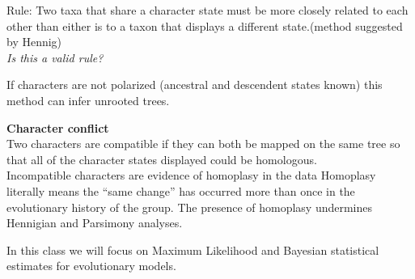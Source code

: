 \documentclass{beamer}
\begin{document}






\begin{frame}
Rule: Two taxa that share a character state must be more
closely related to each other than either is to a taxon that
displays a different state.(method suggested by Hennig)\\ 
\textit{Is this a valid rule?}
\end{frame}
% 






\begin{frame}
If characters are not polarized (ancestral and descendent states known)
this method can infer unrooted trees. \\
\medskip
\end{frame}





\begin{frame}
\textbf{Character conflict}\\
Two characters are compatible if they can both be mapped on the same
tree so that all of the character states displayed could be homologous.\\
\pause
\medskip
Incompatible characters are evidence of homoplasy in the data
\pause
\medskip
Homoplasy literally means the “same change” has occurred more than once
in the evolutionary history of the group.
The presence of homoplasy undermines Hennigian and Parsimony analyses.
\end{frame}






\begin{frame}
In this class we will focus on Maximum Likelihood and Bayesian statistical estimates for evolutionary models.
\end{frame}
\end{document}
